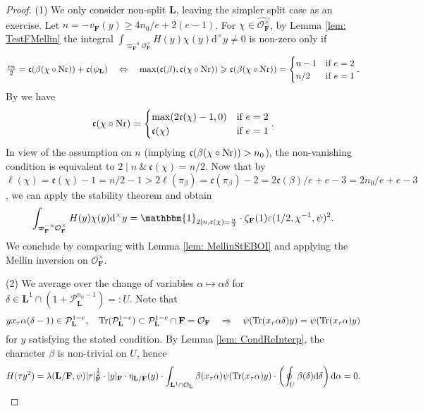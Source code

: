 \documentclass[A4]{amsart}
\makeatletter
\def\geq{\geqslant}
\numberwithin{equation}{section} \everymath{\displaystyle}
\newcommand{\Nr}{{\rm Nr}}
\newcommand{\Tr}{{\rm Tr}}
\newcommand{\id}{\mathbbm{1}}
\newcommand{\ud}{\mathrm{d}}
\newcommand{\F}{\mathbf{F}}
\newcommand{\bL}{\mathbf{L}}
\newcommand{\vO}{\mathcal{O}}
\newcommand{\vP}{\mathcal{P}}
\newcommand{\norm}[1][\cdot]{\lvert #1 \rvert}
\newcommand{\cond}{\mathfrak{c}}
\newcommand{\Rmnum}[1]{\expandafter\@slowromancap\romannumeral #1@}
\makeatother
\begin{document}
\begin{proof}
	(1) We only consider non-split $\bL$, leaving the simpler split case as an exercise. Let $n = -v_{\F}(y) \geq 4n_0/e+2(e-1)$. For $\chi \in \widehat{\vO_{\F}^{\times}}$, by Lemma \ref{lem: TestFMellin} the integral $\int_{\varpi_{\F}^{-n}\vO_{\F}^{\times}} H(y) \chi(y) \ud^{\times}y \neq 0$ is non-zero only if
	$$ \tfrac{en}{2} = \cond(\beta (\chi \circ \Nr)) + \cond(\psi_{\bL}) \quad \Leftrightarrow \quad \max(\cond(\beta), \cond(\chi \circ \Nr)) \geq \cond(\beta (\chi \circ \Nr)) = \begin{cases} n-1 & \text{if } e=2 \\ n/2 & \text{if } e=1 \end{cases}. $$
	By \cite[Proposition \Rmnum{5}.2.3 \& Corollay \Rmnum{5}.3.3]{Se79} we have
\begin{equation} \label{eq: CondCompNormF} 
	\cond(\chi \circ \Nr) = \begin{cases} \max(2\cond(\chi)-1,0) & \text{if } e=2 \\ \cond(\chi) & \text{if } e=1 \end{cases}. 
\end{equation}
	In view of the assumption on $n$ (implying $\cond(\beta (\chi \circ \Nr)) > n_0$), the non-vanishing condition is equivalent to $2 \mid n \ \& \ \cond(\chi)=n/2$. Now that by \cite[Theorem 4.7]{JL70} $\ell(\chi) = \cond(\chi)-1 = n/2-1 > 2\ell(\pi_{\beta}) = \cond(\pi_{\beta})-2 = 2\cond(\beta)/e+e-3 = 2n_0/e+e-3$, we can apply the stability theorem \cite[Theorem 25.7]{BuH06} and obtain
\begin{equation} \label{eq: DHRel}
	\int_{\varpi_{\F}^{-n}\vO_{\F}^{\times}} H(y) \chi(y) \ud^{\times}y = \id_{2 \mid n, \cond(\chi)=\frac{n}{2}} \cdot \zeta_{\F}(1) \varepsilon(1/2,\chi^{-1},\psi)^2. 
\end{equation}
	We conclude by comparing with Lemma \ref{lem: MellinStEBOI} and applying the Mellin inversion on $\vO_{\F}^{\times}$.
	
\noindent (2) We average over the change of variables $\alpha \mapsto \alpha \delta$ for $\delta \in \bL^1 \cap (1+\vP_{\bL}^{n_0-1}) =: U$. Note that
	$$ y x_{\tau} \alpha (\delta - 1) \in \vP_{\bL}^{1-e}, \quad \Tr(\vP_{\bL}^{1-e}) \subset \vP_{\bL}^{1-e} \cap \F = \vO_{\F} \quad \Rightarrow \quad \psi(\Tr(x_{\tau} \alpha \delta) y) = \psi(\Tr(x_{\tau} \alpha) y) $$
	for $y$ satisfying the stated condition. By Lemma \ref{lem: CondReInterp}, the character $\beta$ is non-trivial on $U$, hence
	$$ H(\tau y^2) = \lambda(\bL/\F,\psi) \norm[\tau]_{\F}^{\frac{1}{2}} \cdot \norm[y]_{\F} \cdot \eta_{\bL/\F}(y) \cdot \int_{\bL^1 \cap \vO_{\bL}} \beta(x_{\tau} \alpha) \psi(\Tr(x_{\tau} \alpha) y) \cdot \left( \oint_{U} \beta(\delta) \ud \delta \right) \ud \alpha = 0. $$
	

\end{proof}
\end{document}
